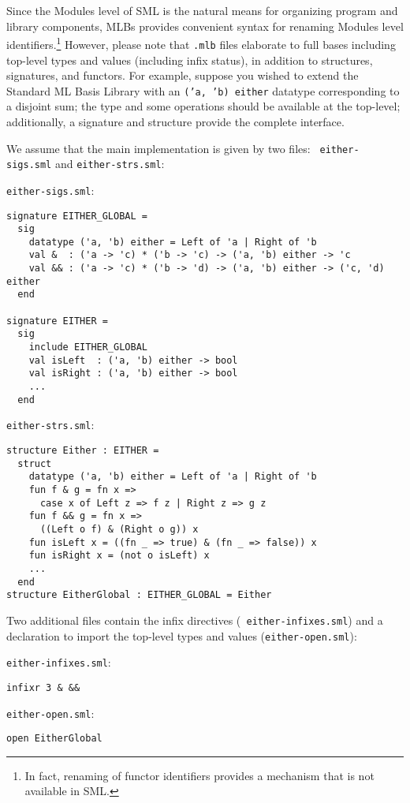 Since the Modules level of SML is the natural means for organizing
program and library components, MLBs provides convenient syntax for
renaming Modules level identifiers.\footnote{In fact, renaming of
functor identifiers provides a mechanism that is not available in
SML.}  However, please note that {\tt .mlb} files elaborate to full
bases including top-level types and values (including infix status),
in addition to structures, signatures, and functors.  For example,
suppose you wished to extend the Standard ML Basis Library with an
{\tt ('a, 'b) either} datatype corresponding to a disjoint sum; the
type and some operations should be available at the top-level;
additionally, a signature and structure provide the complete
interface.

We assume that the main implementation is given by two files: {\tt
either-sigs.sml} and {\tt either-strs.sml}:

\begin{description}
\item{{\tt either-sigs.sml}:}
\begin{verbatim}
signature EITHER_GLOBAL =
  sig
    datatype ('a, 'b) either = Left of 'a | Right of 'b
    val &  : ('a -> 'c) * ('b -> 'c) -> ('a, 'b) either -> 'c
    val && : ('a -> 'c) * ('b -> 'd) -> ('a, 'b) either -> ('c, 'd) either
  end

signature EITHER =
  sig
    include EITHER_GLOBAL
    val isLeft  : ('a, 'b) either -> bool
    val isRight : ('a, 'b) either -> bool
    ...
  end
\end{verbatim}
\item{{\tt either-strs.sml}:}
\begin{verbatim}
structure Either : EITHER =
  struct
    datatype ('a, 'b) either = Left of 'a | Right of 'b
    fun f & g = fn x =>
      case x of Left z => f z | Right z => g z
    fun f && g = fn x =>
      ((Left o f) & (Right o g)) x
    fun isLeft x = ((fn _ => true) & (fn _ => false)) x
    fun isRight x = (not o isLeft) x
    ...
  end
structure EitherGlobal : EITHER_GLOBAL = Either
\end{verbatim}
\end{description}

Two additional files contain the infix directives ({\tt
either-infixes.sml}) and a declaration to import the top-level types
and values ({\tt either-open.sml}):
\begin{description}
\item{{\tt either-infixes.sml}:}
\begin{verbatim}
infixr 3 & &&
\end{verbatim}
\item{{\tt either-open.sml}:}
\begin{verbatim}
open EitherGlobal
\end{verbatim}
\end{description}

